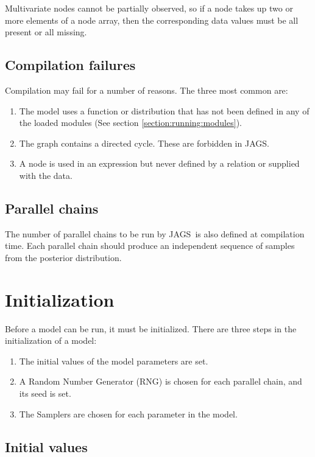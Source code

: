 \documentclass[11pt, a4paper, titlepage]{report}
\newcommand{\JAGS}{\textsf{JAGS}}
\begin{document}
Multivariate nodes cannot be partially observed, so if a node takes up
two or more elements of a node array, then the corresponding data
values must be all present or all missing.

\subsection{Compilation failures}

Compilation may fail for a number of reasons. The three most common are:
\begin{enumerate}
\item The model uses a function or distribution that has not been
  defined in any of the loaded modules (See section
  \ref{section:running:modules}). 
\item The graph contains a directed cycle.  These are forbidden
  in \JAGS.
\item A node is used in an expression but never defined by a relation
  or supplied with the data.
\end{enumerate}

\subsection{Parallel chains}

The number of parallel chains to be run by \JAGS\ is also defined at
compilation time.  Each parallel chain should produce an independent
sequence of samples from the posterior distribution.

\section{Initialization}

Before a model can be run, it must be initialized. There are three
steps in the initialization of a model:
\begin{enumerate}
\item The initial values of the model parameters are set.
\item A Random Number Generator (RNG) is chosen for each parallel chain,
  and its seed is set.
\item The Samplers are chosen for each parameter in the model. 
\end{enumerate}

\subsection{Initial values}
\end{document}
